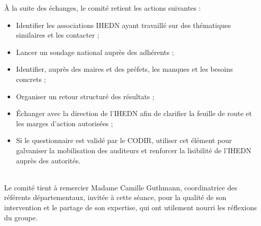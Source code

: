 \documentclass[12pt,a4paper]{article}
\begin{document}
À la suite des échanges, le comité retient les actions suivantes :

\begin{itemize}
\item Identifier les associations IHEDN ayant travaillé sur des thématiques similaires et les contacter ;
\item Lancer un sondage national auprès des adhérents ;
\item Identifier, auprès des maires et des préfets, les manques et les besoins concrets ;
\item Organiser un retour structuré des résultats ;
\item Échanger avec la direction de l'IHEDN afin de clarifier la feuille de route et les marges d'action autorisées ;
\item Si le questionnaire est validé par le CODIR, utiliser cet élément pour galvaniser la mobilisation des auditeurs et renforcer la lisibilité de l'IHEDN auprès des autorités.
\end{itemize}
~\\
Le comité tient à remercier Madame Camille Guthmann, coordinatrice des référents départementaux, invitée à cette séance, pour la qualité de son intervention et le partage de son expertise, qui ont utilement nourri les réflexions du groupe.
\end{document}
